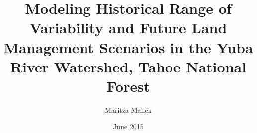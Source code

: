 \documentclass[12pt]{book}
\begin{document}
\author{Maritza Mallek}
\title{Modeling Historical Range of Variability and Future Land Management Scenarios in the Yuba River Watershed, Tahoe National Forest}
\date{June 2015}

%

\maketitle
\frontmatter 
\tableofcontents 
% 

\mainmatter 

 
 
 

 
  

\backmatter 
% 
% 
\end{document}
